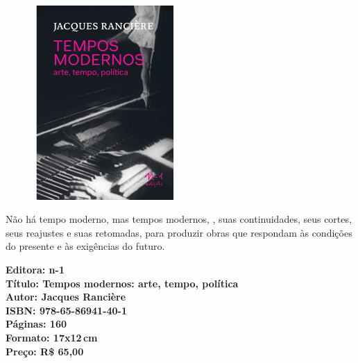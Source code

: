 \pagebreak %


\begin{center}
\hspace*{-3.6cm}
\hspace*{3.1cm}\includegraphics[width=74mm]{./CAPAS/N-1_JACQUES.jpg}
\end{center}

\hspace*{-7cm}\hrulefill\hspace*{-7cm}

\medskip

\noindent{}Não há tempo moderno, mas tempos modernos, , suas continuidades, seus cortes, seus reajustes e suas retomadas, para produzir obras que respondam às condições do presente e às exigências do futuro.
\vfill

\hspace*{-.4cm}\begin{minipage}[c]{.8\linewidth}
\small\textbf{
\hspace*{-.1cm}Editora: n-1\\
Título: Tempos modernos: arte, tempo, política\\
Autor: Jacques Rancière\\ 
ISBN: 978-65-86941-40-1\\
Páginas: 160\\
Formato: 17x12\,cm\\
Preço: R\$ 65,00\\
}
\end{minipage}

\pagebreak

